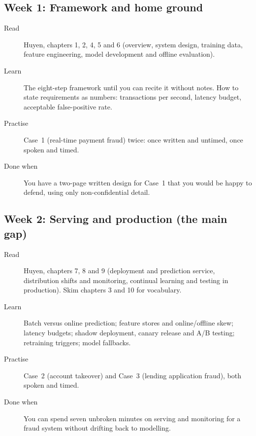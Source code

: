 \documentclass[10pt,a4paper]{article}
\begin{document}
\subsection{Week 1: Framework and home ground}
\begin{description}
  \item[Read] Huyen, chapters 1, 2, 4, 5 and 6 (overview, system design,
    training data, feature engineering, model development and offline
    evaluation).
  \item[Learn] The eight-step framework until you can recite it without notes.
    How to state requirements as numbers: transactions per second, latency
    budget, acceptable false-positive rate.
  \item[Practise] Case~1 (real-time payment fraud) twice: once written and
    untimed, once spoken and timed.
  \item[Done when] You have a two-page written design for Case~1 that you
    would be happy to defend, using only non-confidential detail.
\end{description}

\subsection{Week 2: Serving and production (the main gap)}
\begin{description}
  \item[Read] Huyen, chapters 7, 8 and 9 (deployment and prediction service,
    distribution shifts and monitoring, continual learning and testing in
    production). Skim chapters 3 and 10 for vocabulary.
  \item[Learn] Batch versus online prediction; feature stores and
    online/offline skew; latency budgets; shadow deployment, canary release
    and A/B testing; retraining triggers; model fallbacks.
  \item[Practise] Case~2 (account takeover) and Case~3 (lending application
    fraud), both spoken and timed.
  \item[Done when] You can spend seven unbroken minutes on serving and
    monitoring for a fraud system without drifting back to modelling.
\end{description}

\end{document}
